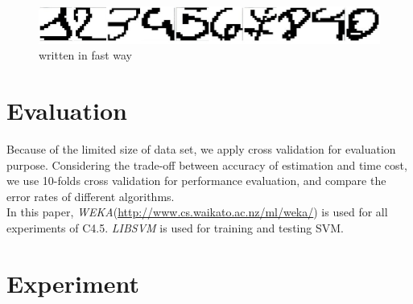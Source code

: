 \documentclass[a4paper,11pt]{article}
\begin{document}
\begin{figure}
\centering
\includegraphics[width=1.0\textwidth]{unclear}
\caption{written in fast way}
\end{figure}

\section{Evaluation}

Because of the limited size of data set, we apply cross validation for evaluation purpose. Considering the trade-off between accuracy of estimation and time cost, we use 10-folds cross validation for performance evaluation, and compare the error rates of different algorithms.\\
In this paper, \emph{WEKA}(\url{http://www.cs.waikato.ac.nz/ml/weka/}) is used for all experiments of C4.5. \emph{LIBSVM}\cite{libsvm} is used for training and testing SVM.\\
\section{Experiment}
\end{document}
